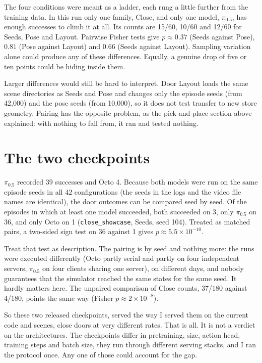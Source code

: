 The four conditions were meant as a ladder, each rung a little further from the training data. In this run only one family, Close, and only one model, $\pi_{0.5}$, has enough successes to climb it at all. Its counts are 15/60, 10/60 and 12/60 for Seeds, Pose and Layout. Pairwise Fisher tests give $p \approx 0.37$ (Seeds against Pose), $0.81$ (Pose against Layout) and $0.66$ (Seeds against Layout). Sampling variation alone could produce any of these differences. Equally, a genuine drop of five or ten points could be hiding inside them.

Larger differences would still be hard to interpret. Door Layout loads the same scene directories as Seeds and Pose and changes only the episode seeds (from 42,000) and the pose seeds (from 10,000), so it does not test transfer to new store geometry. Pairing has the opposite problem, as the pick-and-place section above explained: with nothing to fall from, it ran and tested nothing.

\section{The two checkpoints}
\label{sec:models}

$\pi_{0.5}$ recorded 39 successes and Octo 4. Because both models were run on the same episode seeds in all 42 configurations (the seeds in the logs and the video file names are identical), the door outcomes can be compared seed by seed. Of the episodes in which at least one model succeeded, both succeeded on 3, only $\pi_{0.5}$ on 36, and only Octo on 1 (\texttt{close\_showcase}, Seeds, seed 104). Treated as matched pairs, a two-sided sign test on 36 against 1 gives $p \approx 5.5\times10^{-10}$.

Treat that test as description. The pairing is by seed and nothing more: the runs were executed differently (Octo partly serial and partly on four independent servers, $\pi_{0.5}$ on four clients sharing one server), on different days, and nobody guarantees that the simulator reached the same states for the same seed. It hardly matters here. The unpaired comparison of Close counts, 37/180 against 4/180, points the same way (Fisher $p \approx 2\times10^{-8}$).

So these two released checkpoints, served the way I served them on the current code and scenes, close doors at very different rates. That is all. It is not a verdict on the architectures. The checkpoints differ in pretraining, size, action head, training steps and batch size, they run through different serving stacks, and I ran the protocol once. Any one of those could account for the gap.

